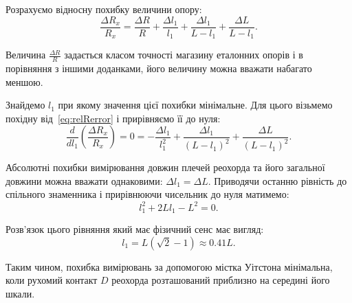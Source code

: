 \documentclass{LabWork}
\begin{document}
Розрахуємо відносну похибку величини опору:
\begin{equation}\label{eq:relRerror}
    \frac{\Delta R_x}{R_x} = \frac{\Delta R}{R} +  \frac{\Delta l_1}{l_1}  + \frac{\Delta l_1}{L - l_1} + \frac{\Delta L}{L - l_1}.
\end{equation}

Величина $\frac{\Delta R}{R}$ задається класом точності магазину еталонних опорів і в порівняння з іншими доданками, його величину можна вважати набагато меншою.

Знайдемо $l_1$ при якому значення цієї похибки мінімальне. Для цього візьмемо похідну від~\eqref{eq:relRerror} і прирівняємо її до нуля:
\begin{equation*}\label{eq:minrelRerror}
    \frac{d}{d l_1}\left( \frac{\Delta R_x}{R_x} \right) = 0 = - \frac{\Delta l_1}{l_1^2} + \frac{\Delta l_1}{(L - l_1)^2} + \frac{\Delta L}{(L - l_1)^2}.
\end{equation*}

Абсолютні похибки вимірювання довжин плечей реохорда та його загальної довжини можна вважати однаковими: $\Delta l_1 = \Delta L$. Приводячи останню рівність до спільного знаменника і прирівнюючи чисельник до нуля матимемо:
\begin{equation*}
    l_1^2 + 2Ll_1 - L^2 = 0.
\end{equation*}

Розв'язок цього рівняння який має фізичний сенс має вигляд:
\begin{equation*}\label{eq:l1min}
    l_1 = L(\sqrt2 - 1) \approx 0.41 L.
\end{equation*}

Таким чином, похибка вимірювань за допомогою містка Уітстона мінімальна, коли рухомий контакт $D$ реохорда розташований приблизно на середині його шкали.
\end{document}
